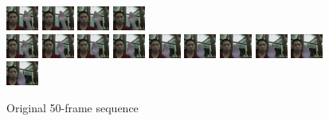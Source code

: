 \documentclass[12pt]{article}
\begin{document}
\begin{figure}[H]
\includegraphics[width=40px, height=30px]{../data/analysis/img0036.jpg}
\includegraphics[width=40px, height=30px]{../data/analysis/img0037.jpg}
\includegraphics[width=40px, height=30px]{../data/analysis/img0038.jpg}
\includegraphics[width=40px, height=30px]{../data/analysis/img0039.jpg} \\
\includegraphics[width=40px, height=30px]{../data/analysis/img0040.jpg}
\includegraphics[width=40px, height=30px]{../data/analysis/img0041.jpg}
\includegraphics[width=40px, height=30px]{../data/analysis/img0042.jpg}
\includegraphics[width=40px, height=30px]{../data/analysis/img0043.jpg}
\includegraphics[width=40px, height=30px]{../data/analysis/img0044.jpg}
\includegraphics[width=40px, height=30px]{../data/analysis/img0045.jpg}
\includegraphics[width=40px, height=30px]{../data/analysis/img0046.jpg}
\includegraphics[width=40px, height=30px]{../data/analysis/img0047.jpg}
\includegraphics[width=40px, height=30px]{../data/analysis/img0048.jpg}
\includegraphics[width=40px, height=30px]{../data/analysis/img0049.jpg}
\caption{Original 50-frame sequence}
\label{seq-original}
\end{figure}
\end{document}
